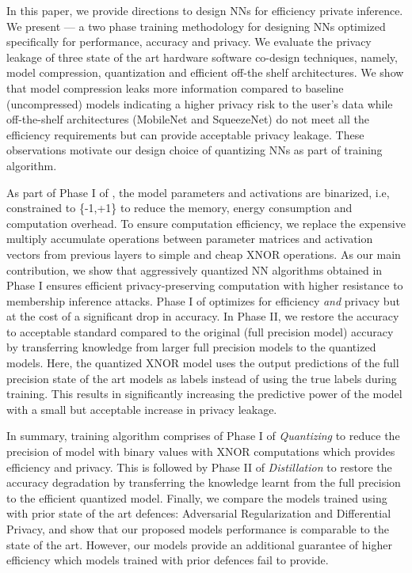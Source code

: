 In this paper, we provide directions to design NNs for efficiency private inference.
We present \method --- a two phase training methodology for designing NNs optimized specifically for performance, accuracy and privacy.
We evaluate the privacy leakage of three state of the art hardware software co-design techniques, namely, model compression, quantization and efficient off-the shelf architectures.
We show that model compression leaks more information compared to baseline (uncompressed) models indicating a higher privacy risk to the user's data while off-the-shelf architectures (MobileNet and SqueezeNet) do not meet all the efficiency requirements but can provide acceptable privacy leakage.
These observations motivate our design choice of quantizing NNs as part of \method\hspace{0.02in} training algorithm.

As part of Phase I of \method, the model parameters and activations are binarized, i.e, constrained to \{-1,+1\} to reduce the memory, energy consumption and computation overhead.
To ensure computation efficiency, we replace the expensive multiply accumulate operations between parameter matrices and activation vectors from previous layers to simple and cheap XNOR operations.
As our main contribution, we show that aggressively quantized NN algorithms obtained in Phase I ensures efficient privacy-preserving computation with higher resistance to membership inference attacks.
Phase I of \method\hspace{0.02in} optimizes for efficiency \textit{and} privacy but at the cost of a significant drop in accuracy.
In Phase II, we restore the accuracy to acceptable standard compared to the original (full precision model) accuracy by transferring knowledge from larger full precision models to the quantized models.
Here, the quantized XNOR model uses the output predictions of the full precision state of the art models as labels instead of using the true labels during training.
This results in significantly increasing the predictive power of the model with a small but acceptable increase in privacy leakage.

In summary, \method\hspace{0.02in} training algorithm comprises of Phase I of \textit{Quantizing} to reduce the precision of model with binary values with XNOR computations which provides efficiency and privacy.
This is followed by Phase II of \textit{Distillation} to restore the accuracy degradation by transferring the knowledge learnt from the full precision to the efficient quantized model.
Finally, we compare the models trained using \method\hspace{0.02in} with prior state of the art defences: Adversarial Regularization and Differential Privacy, and show that our proposed models performance is comparable to the state of the art.
However, our models provide an additional guarantee of higher efficiency which models trained with prior defences fail to provide.

